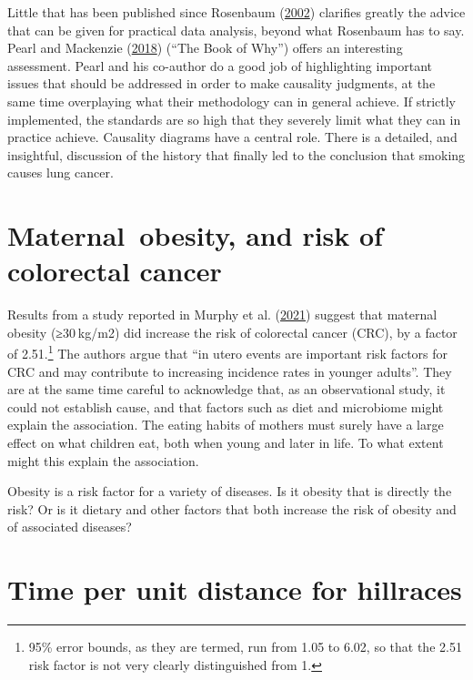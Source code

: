 \documentclass[
  10pt,
  b5paper]{book}
\begin{document}
Little that has been published since Rosenbaum (\protect\hyperlink{ref-RosBook}{2002}) clarifies greatly the
advice that can be given for practical data analysis, beyond what
Rosenbaum has to say. Pearl and Mackenzie (\protect\hyperlink{ref-pearl2018book}{2018}) (``The Book of Why'') offers an
interesting assessment. Pearl and his co-author do a good job of
highlighting important issues that should be addressed in order to
make causality judgments, at the same time overplaying what their
methodology can in general achieve. If strictly implemented,
the standards are so high that they severely limit what they can
in practice achieve. Causality diagrams have a central role.
There is a detailed, and insightful, discussion of the history
that finally led to the conclusion that smoking causes lung cancer.

\hypertarget{maternal-obesity-and-risk-of-colorectal-cancer}{%
\section{Maternal~obesity, and risk of colorectal cancer}\label{maternal-obesity-and-risk-of-colorectal-cancer}}

Results from a study reported in Murphy et al. (\protect\hyperlink{ref-Murphygutjnl-2021-325001}{2021}) suggest
that maternal obesity (≥30 kg/m2) did increase the risk of
colorectal cancer (CRC), by a factor of 2.51.\footnote{95\%
  error bounds, as they are termed, run from 1.05 to 6.02,
  so that the 2.51 risk factor is not very clearly distinguished
  from 1.} The authors argue that ``in utero events are important
risk factors for CRC and may contribute to increasing incidence
rates in younger adults''. They are at the same time careful to
acknowledge that, as an observational study, it could not
establish cause, and that factors such as diet and microbiome
might explain the association. The eating habits of mothers
must surely have a large effect on what children eat, both when
young and later in life. To what extent might this explain
the association.

Obesity is a risk factor for a variety of diseases. Is it
obesity that is directly the risk? Or is it dietary and
other factors that both increase the risk of obesity and
of associated diseases?

\hypertarget{time-per-unit-distance-for-hillraces}{%
\section{Time per unit distance for hillraces}\label{time-per-unit-distance-for-hillraces}}
\end{document}
